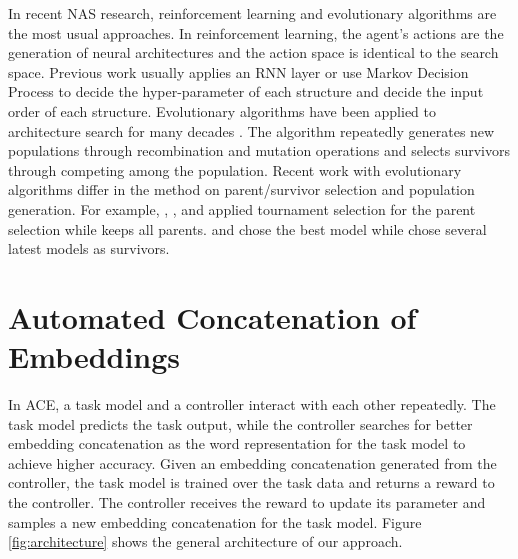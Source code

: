 \documentclass[11pt,a4paper]{article}
\begin{document}
In recent NAS research, reinforcement learning and evolutionary algorithms are the most usual approaches. 
In reinforcement learning, the agent's actions are the generation of neural architectures and the action space is identical to the search space. Previous work usually applies an RNN layer \citep{zoph2016neural,zhong2018practical,zoph2018learning} or use Markov Decision Process \citep{baker2016designing} to decide the hyper-parameter of each structure and decide the input order of each structure.
Evolutionary algorithms have been applied to architecture search for many decades \citep{geoffrey1989designing,angeline1994evolutionary,stanley2002evolving,floreano2008neuroevolution,jozefowicz2015empirical}. The algorithm repeatedly generates new populations through recombination and mutation operations and selects survivors through competing among the population. Recent work with evolutionary algorithms differ in the method on parent/survivor selection and population generation. For example, \citet{real2017large}, \citet{liu2018hierarchical}, \citet{wistuba2018deep} and \citet{real2019regularized} applied tournament selection \citep{goldberg1991comparative} for the parent selection while \citet{xie2017genetic} keeps all parents. \citet{suganuma2017genetic} and \citet{elsken2017simple} chose the best model while \citet{real2019regularized} chose several latest models as survivors.







\section{Automated Concatenation of Embeddings}
In ACE, a task model and a controller interact with each other repeatedly. The task model predicts the task output, while the controller searches for better embedding concatenation as the word representation for the task model to achieve higher accuracy. Given an embedding concatenation generated from the controller, the task model is trained over the task data and returns a reward to the controller. The controller receives the reward to update its parameter and samples a new embedding concatenation for the task model. 
Figure \ref{fig:architecture} shows the general architecture of our approach.
\end{document}

